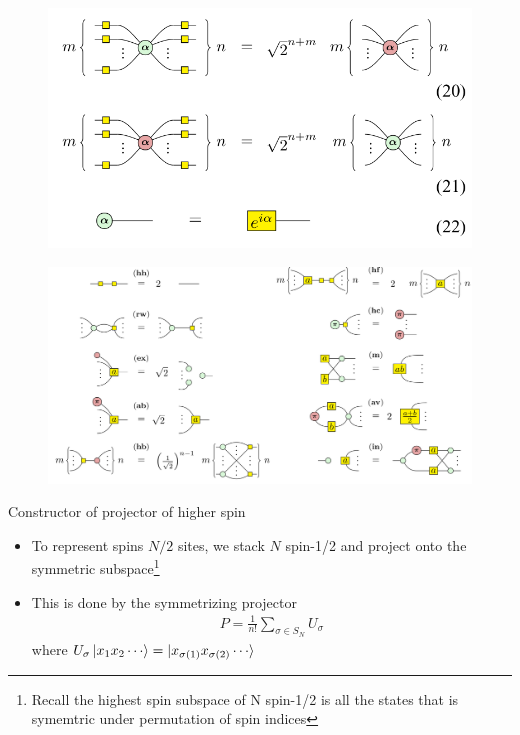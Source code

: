 \documentclass[aspectratio=169,xcolor=dvipsnames, t]{beamer}
\begin{document}
\begin{frame}
    \begin{figure}
        \includegraphics[width=\textwidth]{figures/zx_rewrite_rules_p2.png}
    \end{figure}
\end{frame}

\begin{frame}
    \begin{figure}
        \includegraphics[width=\textwidth]{figures/zx_rewrite_rules_p3.png}
    \end{figure}
\end{frame}

\begin{frame}{Constructor of projector of higher spin}
    \begin{itemize}
        \item To represent spins $N/2$ sites, we stack $N$ spin-1/2 and project onto the symmetric subspace\footnote{Recall the highest spin subspace of N spin-1/2 is all the states that is symemtric under permutation of spin indices}
        \item This is done by the symmetrizing projector
        \begin{align*}
            P = \frac{1}{n!}\sum_{\sigma \in S_N} U_\sigma
        \end{align*}
        where $U_\sigma\ket{x_1 x_2\cdots} = \ket{x_{\sigma(1)}x_{\sigma(2)} \cdots}$
    \end{itemize}
\end{frame}
\end{document}

